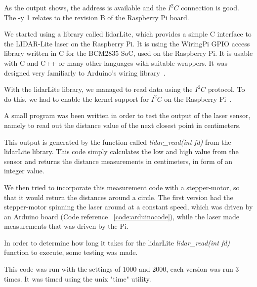 As the output shows, the address is available and the $I^2C$ connection is good. The -y 1 relates to the revision B of the Raspberry Pi board.

We started using a library called lidarLite, which provides a simple C interface to the LIDAR-Lite laser on the Raspberry Pi. It is using the WiringPi GPIO access library written in C for the BCM2835 SoC, used on the Raspberry Pi. It is usable with C and C++ or many other languages with suitable wrappers. It was designed very familiarly to Arduino's wiring library~\cite{wiringPi-similarities}.

With the lidarLite library\cite{lidarlib}, we managed to read data using the $I^2C$ protocol. To do this, we had to enable the kernel support for $I^2C$ on the Raspberry Pi~\cite{i2csetup}.

A small program was been written in order to test the output of the laser sensor, namely to read out the distance value of the next closest point in centimeters. 



This output is generated by the function called \textit{lidar\_read(int fd)} from the lidarLite library. This code simply calculates the low and high value from the sensor and returns the distance measurements in centimeters, in form of an integer value.

\clearpage



We then tried to incorporate this measurement code with a stepper-motor, so that it would return the distances around a circle. The first version had the stepper-motor spinning the laser around at a constant speed, which was driven by an Arduino board (Code reference ~\ref{code:arduinocode}), while the laser made measurements that was driven by the Pi.

In order to determine how long it takes for the lidarLite \textit{lidar\_read(int fd)} function to execute, some testing was made.



This code was run with the settings of 1000 and 2000, each version was run 3 times. It was timed using the unix "time" utility.

